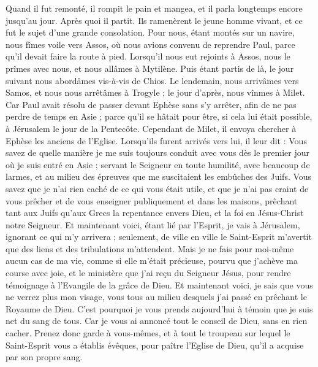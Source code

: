 \begin{multicols}{2}
{{Quand il fut remonté, il rompit le pain et mangea, et il parla longtemps encore jusqu'au jour. Après quoi il partit.
Ils ramenèrent le jeune homme vivant, et ce fut le sujet d'une grande consolation.
Pour nous, étant montés sur un navire, nous fîmes voile vers Assos, où nous avions convenu de reprendre Paul, parce qu'il devait faire la route à pied.
Lorsqu'il nous eut rejoints à Assos, nous le prîmes avec nous, et nous allâmes à Mytilène.
Puis étant partis de là, le jour suivant nous abordâmes vis-à-vis de Chios. Le lendemain, nous arrivâmes vers Samos, et nous nous arrêtâmes à Trogyle ; le jour d'après, nous vînmes à Milet.
Car Paul avait résolu de passer devant Ephèse sans s'y arrêter, afin de ne pas perdre de temps en Asie ; parce qu'il se hâtait pour être, si cela lui était possible, à Jérusalem le jour de la Pentecôte.
Cependant de Milet, il envoya chercher à Ephèse les anciens de l'Eglise.
Lorsqu'ils furent arrivés vers lui, il leur dit : Vous savez de quelle manière je me suis toujours conduit avec vous dès le premier jour où je suis entré en Asie ;
servant le Seigneur en toute humilité, avec beaucoup de larmes, et au milieu des épreuves que me suscitaient les embûches des Juifs.
Vous savez que je n'ai rien caché de ce qui vous était utile, et que je n'ai pas craint de vous prêcher et de vous enseigner publiquement et dans les maisons,
prêchant tant aux Juifs qu'aux Grecs la repentance envers Dieu, et la foi en Jésus-Christ notre Seigneur.
Et maintenant voici, étant lié par l'Esprit, je vais à Jérusalem, ignorant ce qui m'y arrivera ;
seulement, de ville en ville le Saint-Esprit m'avertit que des liens et des tribulations m'attendent.
Mais je ne fais pour moi-même aucun cas de ma vie, comme si elle m'était précieuse, pourvu que j'achève ma course avec joie, et le ministère que j'ai reçu du Seigneur Jésus, pour rendre témoignage à l'Evangile de la grâce de Dieu.
Et maintenant voici, je sais que vous ne verrez plus mon visage, vous tous au milieu desquels j'ai passé en prêchant le Royaume de Dieu.
C'est pourquoi je vous prends aujourd'hui à témoin que je suis net du sang de tous.
Car je vous ai annoncé tout le conseil de Dieu, sans en rien cacher.
Prenez donc garde à vous-mêmes, et à tout le troupeau sur lequel le Saint-Esprit vous a établis évêques, pour paître l'Eglise de Dieu, qu'il a acquise par son propre sang.
}}
\end{multicols}
